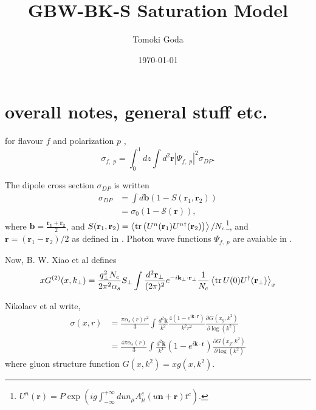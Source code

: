 \documentclass[12pt]{article}
\begin{document}
	
\author{Tomoki Goda}
\title{GBW-BK-S Saturation Model}
\date{\today}

\maketitle
	
{}


\section{overall notes, general stuff etc.}

for flavour $f$ and polarization $p$ \cite{cambqcd}\cite{gbw1998},
\begin{equation}
	\sigma_{f,\;p}=\int_{0}^{1} d z \int d^2\mathbf{r}|\Psi_{f,\;p}|^2 \sigma_{DP}.
\end{equation}

The dipole cross section $\sigma_{DP}$ is written \cite{cambqcd}%
\begin{align}
	\sigma_{DP}&=\int d\mathbf{b}(1-S(\mathbf{r}_1,\mathbf{r}_2)) \\
	&=\sigma_0 (1-\mathcal{S}(\mathbf{r})),
\end{align}
where $\mathbf{b}=\frac{\mathbf{r_1}+\mathbf{r_2}}{2}$, and $S(\mathbf{r}_1,\mathbf{r}_2) =\expval{\tr\left( U^n(\mathbf{r}_1) U^{n\dagger}(\mathbf{r}_2)\right)}/N_c$\footnote{$U ^n (\mathbf{r})=P \exp\left(i g \int^{+\infty}_{-\infty}du n_\mu A^c_\mu (u \mathbf{n}+\mathbf{r}) t^c\right)$. %
}, and $ \mathbf{r}=(\mathbf{r}_1-\mathbf{r}_2)/2 $ as defined in \cite{cambqcd}.
\newline
Photon wave functions $\Psi_{f,\;p}$ are avaiable in \cite{gbw1998} \cite{nikolaev1994}.

Now, B. W. Xiao et al \cite{xiao2017} defines 
\begin{equation}
x G^{(2)}(x, k_\perp)=\frac{q_\perp^2 N_c}{2 \pi^2 \alpha_s} S_\perp \int \frac{d^2\mathbf{r}_\perp}{(2\pi)^2} e^{-i \mathbf{k}_\perp\cdot \mathbf{r}_\perp}\frac{1}{N_c}\expval{\tr U(0)U^\dagger(\mathbf{r}_\perp)}_x
\end{equation}

Nikolaev et al write\cite{nikolaev1994},
\begin{align}
\sigma(x,r)&=\frac{\pi \alpha_s(r) r^2}{3}\int\frac{d^2 \mathbf{k}}{k^2}\frac{4\left(1-e^{i\mathbf{k}\cdot\mathbf{r}}\right)}{k^2 r^2}\frac{\partial G(x_g,k^2)}{\partial \log(k^2)}\\
&=\frac{4 \pi \alpha_s(r) }{3}\int\frac{d^2 \mathbf{k}}{k^4}\left(1-e^{i\mathbf{k}\cdot\mathbf{r}}\right) \frac{\partial G(x_g,k^2)}{\partial \log(k^2)}
\label{eq:niktot}
\end{align}
where gluon structure function $G(x,k^2)=x g(x,k^2)$.
\end{document}
